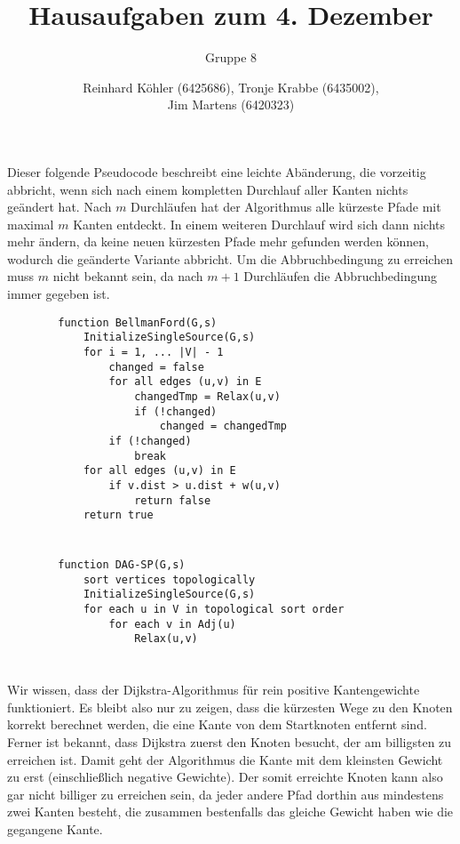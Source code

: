 \documentclass[10pt,a4paper,oneside,ngerman,numbers=noenddot]{scrartcl}
\begin{document}
\author{Reinhard Köhler (6425686), Tronje Krabbe (6435002), \\
Jim Martens (6420323)}
\title{Hausaufgaben zum 4. Dezember}
\subtitle{Gruppe 8}
\maketitle

\section{} %
	Dieser folgende Pseudocode beschreibt eine leichte Abänderung, die vorzeitig abbricht, wenn sich nach einem kompletten Durchlauf aller Kanten nichts geändert hat. Nach $m$ Durchläufen hat der Algorithmus alle kürzeste Pfade mit maximal $m$ Kanten entdeckt. In einem weiteren Durchlauf wird sich dann nichts mehr ändern, da keine neuen kürzesten Pfade mehr gefunden werden können, wodurch die geänderte Variante abbricht. Um die Abbruchbedingung zu erreichen muss $m$ nicht bekannt sein, da nach $m+1$ Durchläufen die Abbruchbedingung immer gegeben ist.
	
	\begin{verbatim}
	    function BellmanFord(G,s)
	        InitializeSingleSource(G,s)
	        for i = 1, ... |V| - 1
	            changed = false	            
	            for all edges (u,v) in E
	                changedTmp = Relax(u,v)
	                if (!changed)
	                    changed = changedTmp
	            if (!changed)
	                break
	        for all edges (u,v) in E
	            if v.dist > u.dist + w(u,v)
	                return false
	        return true
	\end{verbatim}
\section{} %
	\begin{verbatim}
	    function DAG-SP(G,s)
	        sort vertices topologically
	        InitializeSingleSource(G,s)
	        for each u in V in topological sort order
	            for each v in Adj(u)
	                Relax(u,v)
	\end{verbatim}
\section{} %
	Wir wissen, dass der Dijkstra-Algorithmus für rein positive Kantengewichte funktioniert. Es bleibt also nur zu zeigen, dass die kürzesten Wege zu den Knoten korrekt berechnet werden, die eine Kante von dem Startknoten entfernt sind. Ferner ist bekannt, dass Dijkstra zuerst den Knoten besucht, der am billigsten zu erreichen ist. Damit geht der Algorithmus die Kante mit dem kleinsten Gewicht zu erst (einschließlich negative Gewichte). Der somit erreichte Knoten kann also gar nicht billiger zu erreichen sein, da jeder andere Pfad dorthin aus mindestens zwei Kanten besteht, die zusammen bestenfalls das gleiche Gewicht haben wie die gegangene Kante.
	
\end{document}
